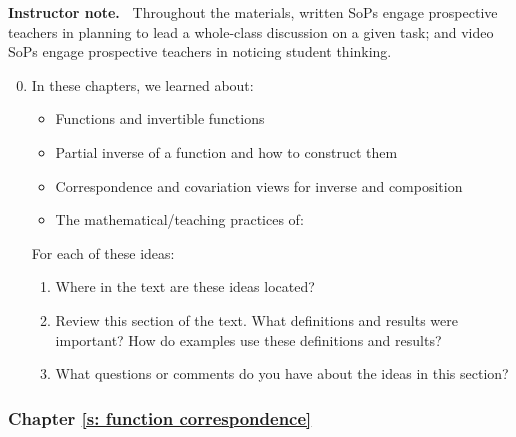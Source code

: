 \documentclass[11pt]{article}
\newenvironment{bignote}[1][Instructor note]%
	{\begin{mdframed}\raggedright{\bf #1.~}}
	{\end{mdframed}}
\theoremstyle{definition}
\begin{document}
\begin{bignote}
Throughout the \MODULES materials, written SoPs engage prospective teachers in planning to lead a whole-class discussion on a given task; and video SoPs engage prospective teachers in noticing student thinking.
\end{bignote}


\begin{enumerate}
\setcounter{enumi}{-1}
\item In these chapters, we learned about:
 	\begin{itemize}
	\item Functions and invertible functions
	\item Partial inverse of a function and how to construct them
	\item Correspondence and covariation views for inverse and composition
	\item The mathematical/teaching practices of:
	\end{itemize}
	For each of these ideas: 
	\begin{enumerate}
	\item Where in the text are these ideas located?
	\item Review this section of the text. What definitions and results were important? How do examples use these definitions and results?
	\item What questions or comments do you have about the ideas in this section?
	\end{enumerate}
\end{enumerate}

\subsubsection*{Chapter \ref{s: function correspondence}}
\end{document}
